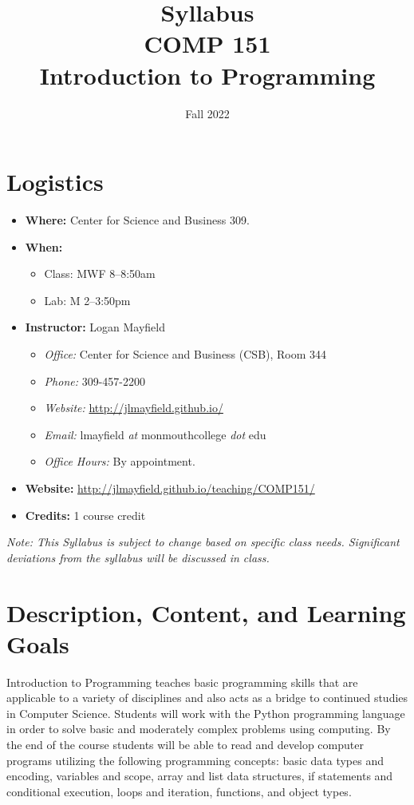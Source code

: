 \documentclass[10pt]{article}
\title{Syllabus \\ COMP 151 \\ Introduction to Programming}
\author{  }
\date{Fall 2022}
\begin{document}
\maketitle

\section{Logistics}
\begin{itemize}
\item \textbf{Where: } Center for Science and Business 309.
\item \textbf{When: }
\begin{itemize}
  \item Class: MWF 8--8:50am
  \item Lab: M 2--3:50pm
\end{itemize}
\item \textbf{Instructor: } Logan Mayfield
\begin{itemize}
\item \textit{Office: } Center for Science and Business (CSB), Room 344
\item \textit{Phone: } 309-457-2200 %
\item \textit{Website: } \url{http://jlmayfield.github.io/}
\item \textit{Email: } lmayfield \textit{at} monmouthcollege \textit{dot} edu
\item \textit{Office Hours: }  By appointment.
\end{itemize}
\item \textbf{Website: } \url{http://jlmayfield.github.io/teaching/COMP151/}
\item \textbf{Credits: } 1 course credit
\end{itemize}
\emph{Note: This Syllabus is subject to change based on specific class needs. Significant deviations from the syllabus will be discussed in class.}


\section{Description, Content, and Learning Goals}

Introduction to Programming teaches basic programming skills that are applicable to a variety of disciplines and also acts as a bridge to continued studies in Computer Science. Students will work with the Python programming language in order to solve basic and moderately complex problems using computing. By the end of the course students will be able to read and develop computer programs utilizing the following programming concepts: basic data types and encoding, variables and scope, array and list data structures, if statements and conditional execution, loops and iteration, functions, and object types.
\end{document}
